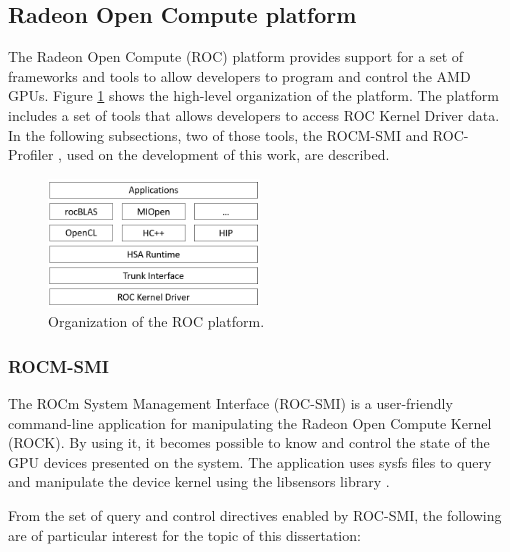 \subsection{Radeon Open Compute platform}

The Radeon Open Compute (ROC) \cite{noauthor_radeonopencompute/rocm_2019} platform provides support for a set of frameworks and tools to allow developers to program and control the AMD GPUs. Figure \ref{fig:rocmplatform} shows the high-level organization of the platform. The platform includes a set of tools that allows developers to access ROC Kernel Driver data. In the following subsections, two of those tools, the ROCM-SMI \cite{noauthor_radeonopencompute/roc-smi_2019} and ROC-Profiler \cite{noauthor_rocm-developer-tools/rocprofiler_2019}, used on the development of this work, are described.

\begin{figure}[!htb]
  \centering
  \includegraphics[width=0.5\textwidth]{Figures/StateArt/rocStack.png}
  \caption{Organization of the ROC platform.}
  \label{fig:rocmplatform}
\end{figure}

\subsubsection{ROCM-SMI}
The ROCm System Management Interface (ROC-SMI) \cite{noauthor_radeonopencompute/roc-smi_2019} is a user-friendly command-line application for manipulating the Radeon Open Compute Kernel (ROCK). By using it, it becomes possible to know and control the state of the GPU devices presented on the system. The application uses sysfs files to query and manipulate the device kernel using the libsensors library \cite{noauthor_libsensors3:_nodate}.

From the set of query and control directives enabled by ROC-SMI, the following are of particular interest for the topic of this dissertation:

